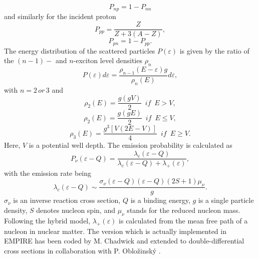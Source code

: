 \begin{equation}
P_{np}=1-P_{nn}  \label{Pnp}
\end{equation}
and similarly for the incident proton
\begin{equation}
P_{pp}=\frac{Z}{Z+3(A-Z)},  \label{Ppp}
\end{equation}
\begin{equation}
P_{pn}=1-P_{pp}.  \label{Ppn}
\end{equation}
The energy distribution of the scattered particles $P(\varepsilon)$ is given
by the ratio of the $(n-1)-$ and $n$-exciton level densities%
 $\rho_{n}$
\begin{equation}
P(\varepsilon)d\varepsilon=%
\frac{\rho_{n-1}(E-\varepsilon)g}{\rho_{n}(E)}d\varepsilon,  \label{Penergy}
\end{equation}
with $n=2\, or\,3$ and%
\begin{equation}
\rho_{2}(E)=\frac{g(gV)}{2}\,\,\, if\,\,\, E>V,  \label{ro2u}
\end{equation}
\begin{equation}
\rho_{2}(E)=\frac{g(gE)}{2}\,\,\, if\,\,\, E\leq V,  \label{ro2d}
\end{equation}
\begin{equation}
\rho_{3}(E)=\frac{g^{3}\left[V(2E-V)\right]}{4}\,\,\, if\,\,\, E\geq V.
\label{ro3}
\end{equation}
Here, $V$ is a potential well depth. The emission probability is calculated
as
\begin{equation}
P_{\nu}(\varepsilon-Q)=\frac{\lambda_{c}(\varepsilon-Q)}{\lambda_{c}(%
\varepsilon-Q)+\lambda_{+}(\varepsilon)},  \label{Pnu}
\end{equation}
with the emission rate being
\begin{equation}
\lambda_{c}(\varepsilon-Q)\sim\frac{\sigma_{\nu}(\varepsilon-Q)(%
\varepsilon-Q)(2S+1)\mu_{\nu}}{g}.  \label{lambdac}
\end{equation}
$\sigma_{\nu}$ is an inverse reaction cross section, $Q$ is a binding
energy, $g$ is a single particle density, $S$ denotes nucleon spin, and $%
\mu_{\nu}$ stands for the reduced nucleon mass. Following the hybrid%
 model, $\lambda_{+}(\varepsilon)$ is calculated from the mean
free path of a nucleon in nuclear matter. The version which is actually
implemented in EMPIRE has been coded by M. Chadwick and extended to
double-differential cross sections in collaboration with P. Oblo\v zinsk\' y
\cite{DDHMScode}.

